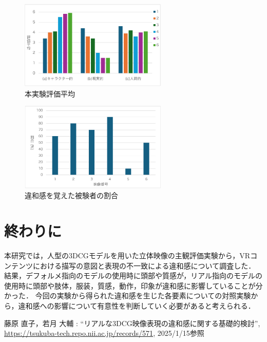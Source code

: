 \documentclass[twocolumn,10pt,a4j]{ltjsarticle}
\begin{document}
\begin{figure}[h]
  \centering
  \includegraphics[width=7cm]{fig1.pdf}
  \caption{本実験評価平均}
  \label{fig1}
\end{figure}

\begin{figure}[h]
  \centering
  \includegraphics[width=7cm]{fig2.pdf}
  \caption{違和感を覚えた被験者の割合}
  \label{fig1}
\end{figure}


\section{終わりに}
本研究では，人型の3DCGモデルを用いた立体映像の主観評価実験から，VRコンテンツにおける描写の意図と表現の不一致による違和感について調査した．
結果，デフォルメ指向のモデルの使用時に頭部や質感が，リアル指向のモデルの使用時に頭部や肢体，服装，質感，動作，印象が違和感に影響していることが分かった．
今回の実験から得られた違和感を生じた各要素についての対照実験から，違和感への影響について有意性を判断していく必要があると考えられる．

\begin{thebibliography}{99}
藤原 直子，若月 大輔 : ``リアルな3DCG映像表現の違和感に関する基礎的検討'', \url{https://tsukuba-tech.repo.nii.ac.jp/records/571}, 2025/1/15参照
\end{thebibliography}
\end{document}
